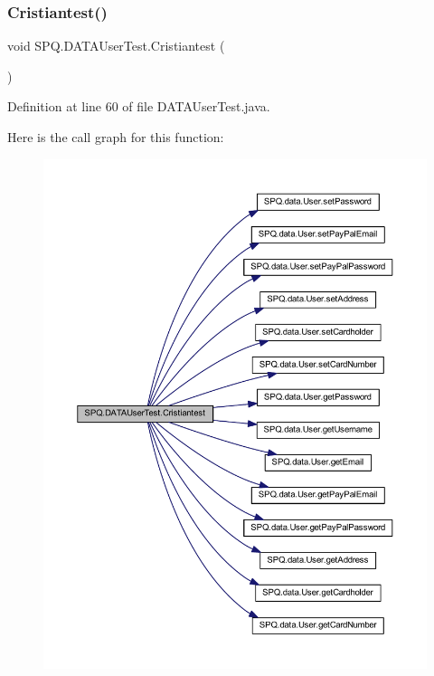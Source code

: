 \subsubsection{\texorpdfstring{Cristiantest()}{Cristiantest()}}
{\footnotesize\ttfamily void S\+P\+Q.\+D\+A\+T\+A\+User\+Test.\+Cristiantest (\begin{DoxyParamCaption}{ }\end{DoxyParamCaption})}



Definition at line 60 of file D\+A\+T\+A\+User\+Test.\+java.

Here is the call graph for this function\+:\nopagebreak
\begin{figure}[H]
\begin{center}
\leavevmode
\includegraphics[width=350pt]{class_s_p_q_1_1_d_a_t_a_user_test_a7defc94d9391e6721dee5c627f75e1fb_cgraph}
\end{center}
\end{figure}
\mbox{\label{class_s_p_q_1_1_d_a_t_a_user_test_a04242b7156b6bb7828bd569de8027fad}} 
